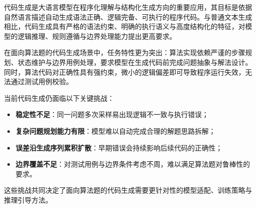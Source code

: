 
代码生成是大语言模型在程序化理解与结构化生成方向的重要应用，其目标是依据自然语言描述自动生成语法正确、逻辑完备、可执行的程序代码。与普通文本生成相比，代码生成具有严格的语法约束、明确的执行语义与高度结构化的特征，对模型的逻辑推理、规则遵循与边界处理能力提出更高要求。

在面向算法题的代码生成场景中，任务特性更为突出：算法实现依赖严谨的步骤规划、状态维护与边界用例处理，要求模型在生成代码前完成问题抽象与解法设计。同时，算法代码对正确性具有强约束，微小的逻辑偏差即可导致程序运行失效，无法通过测试用例校验。

当前代码生成仍面临以下关键挑战：
\begin{itemize}
    \item \textbf{稳定性不足}：同一问题多次采样易出现逻辑不一致与执行错误；
    \item \textbf{复杂问题规划能力有限}：模型难以自动完成合理的解题思路拆解；
    \item \textbf{误差沿生成序列累积扩散}：早期错误会持续影响后续代码的正确性；
    \item \textbf{边界覆盖不足}：对测试用例与边界条件考虑不周，难以满足算法题对鲁棒性的要求。
\end{itemize}
这些挑战共同决定了面向算法题的代码生成需要更针对性的模型适配、训练策略与推理引导方法\cite{yang2024dlcodegen,li2026constrained,feng2020codebert}。